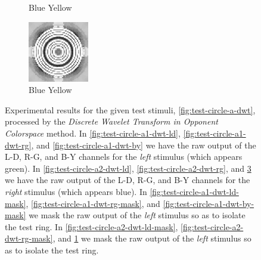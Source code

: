 \documentclass[journal,onecolumn]{IEEEtran}
\begin{document}
{\begin{figure}[H]
\begin{subfigure}[b]{0.25\textwidth}
            \caption{Blue Yellow}
            \label{fig:test-circle-a2-dwt-by-mask}
    \end{subfigure}%
    \begin{subfigure}[b]{0.25\textwidth}
            \centering
            \includegraphics[width=100px, frame]{test-circle-a2-dwt-by}
            \caption{Blue Yellow}
            \label{fig:test-circle-a2-dwt-by}
    \end{subfigure}
    \caption{Experimental results for the given test stimuli, \ref{fig:test-circle-a-dwt}, processed by the \textit{Discrete Wavelet Transform in Opponent Colorspace} method. In \ref{fig:test-circle-a1-dwt-ld}, \ref{fig:test-circle-a1-dwt-rg}, and \ref{fig:test-circle-a1-dwt-by} we have the raw output of the L-D, R-G, and B-Y channels for the \textit{left} stimulus (which appears green). In \ref{fig:test-circle-a2-dwt-ld}, \ref{fig:test-circle-a2-dwt-rg}, and \ref{fig:test-circle-a2-dwt-by} we have the raw output of the L-D, R-G, and B-Y channels for the \textit{right} stimulus (which appears blue). In \ref{fig:test-circle-a1-dwt-ld-mask}, \ref{fig:test-circle-a1-dwt-rg-mask}, and \ref{fig:test-circle-a1-dwt-by-mask} we mask the raw output of the \textit{left} stimulus so as to isolate the test ring. In \ref{fig:test-circle-a2-dwt-ld-mask}, \ref{fig:test-circle-a2-dwt-rg-mask}, and \ref{fig:test-circle-a2-dwt-by-mask} we mask the raw output of the \textit{left} stimulus so as to isolate the test ring.}
\end{figure}
\clearpage
}
\end{document}
